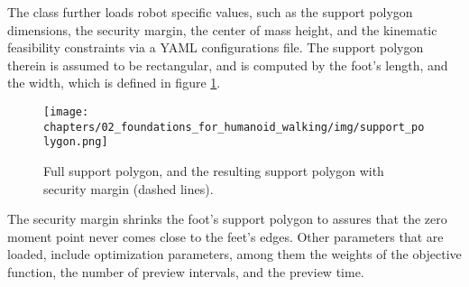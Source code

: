 The  class further loads robot specific values, such as the support polygon dimensions, the security margin, the center of mass height, and the kinematic feasibility constraints via a YAML \cite{ben2005yaml} configurations file. The support polygon therein is assumed to be rectangular, and is computed by the foot's length, and the width, which is defined in figure \ref{fig::62_support_polygon}. 
\begin{figure}[h!]
	\centering
	\texttt{[image: chapters/02\_foundations\_for\_humanoid\_walking/img/support\_polygon.png]}
	\caption{Full support polygon, and the resulting support polygon with security margin (dashed lines).}
	\label{fig::62_support_polygon}
\end{figure}
The security margin shrinks the foot's support polygon to assures that the zero moment point never comes close to the feet's edges. Other parameters that are loaded, include optimization parameters, among them the weights of the objective function, the number of preview intervals, and the preview time.
\FloatBarrier

